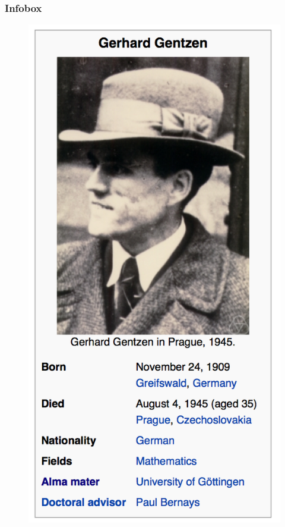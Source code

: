 \documentclass[bigger]{beamer}
\begin{document}
\begin{frame}
  \frametitle{Infobox}
  \begin{figure}
    \centering
    \includegraphics[height=0.8\textheight]{./gentzen-infobox.png}
  \end{figure}
\end{frame}
\end{document}
